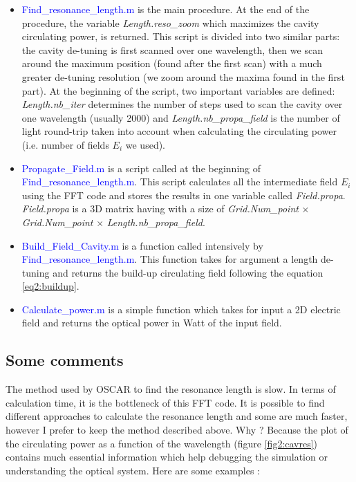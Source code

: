 \begin{itemize}
  \item \textcolor{blue}{Find\_resonance\_length.m} is the main procedure. At the end of the procedure, the variable \textsl{Length.reso\_zoom} which maximizes the cavity circulating power, is returned. This script is divided into two similar parts: the cavity de-tuning is first scanned over one wavelength, then we scan around the maximum position (found after the first scan) with a much greater de-tuning resolution (we zoom around the maxima found in the first part). At the beginning of the script, two important variables are defined: \emph{Length.nb\_iter} determines the number of steps used to scan the cavity over one wavelength (usually 2000) and \emph{Length.nb\_propa\_field} is the number of light round-trip taken into account when calculating the circulating power (i.e. number of fields $E_i$ we used).
  \item \textcolor{blue}{Propagate\_Field.m} is a script called at the beginning of \textcolor{blue}{Find\_resonance\_length.m}. This script calculates all the intermediate field $E_i$ using the FFT code and stores the results in one variable called \emph{Field.propa}. \emph{Field.propa} is a 3D matrix having with a size of \emph{Grid.Num\_point} $\times$ \emph{Grid.Num\_point} $\times$ \emph{Length.nb\_propa\_field}.
  \item \textcolor{blue}{Build\_Field\_Cavity.m} is a function called intensively by \textcolor{blue}{Find\_resonance\_length.m}. This function takes for argument a length de-tuning and returns the build-up circulating  field following the equation \ref{eq2:buildup}.
  \item \textcolor{blue}{Calculate\_power.m} is a simple function which takes for input a 2D electric field and returns the optical power in Watt of the input field.
\end{itemize}

\subsection{Some comments}

The method used by OSCAR to find the resonance length is slow. In terms of calculation time, it is the bottleneck of this FFT code. It is possible to find different approaches to calculate the resonance length and some are much faster, however I prefer to keep the method described above. Why ? Because the plot of the circulating power as a function of the wavelength (figure \ref{fig2:cavres}) contains much essential information which help debugging the simulation or understanding the optical system. Here are some examples :

